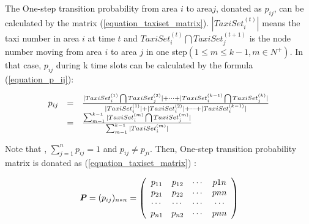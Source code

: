 The One-step transition probability from area $i$ to area$j$, donated as $p_{ij}$, can be calculated by the matrix (\ref{equation_taxiset_matrix}). $|TaxiSet^{(t)}_i|$ means the taxi number in area $i$ at time $t$ and $TaxiSet^{(t)}_i\bigcap TaxiSet^{(t+1)}_j$ is the node number moving from area $i$ to area $j$ in one step$(1\leq m \leq k-1, m\in N^{+} )$.  In that case, $p_{ij}$  during k time slots can be calculated by the formula (\ref{equation_p_ij}):


\begin{equation}\label{equation_p_ij}
\begin{array}{rcl}
  p_{ij}& =&{ {|TaxiSet^{(1)}_i\bigcap TaxiSet^{(2)}_j|+\cdots + |TaxiSet^{(k-1)}_i\bigcap TaxiSet^{(k)}_j|}\over {|TaxiSet^{(1)}_i|+|TaxiSet^{(2)}_i|+\cdots+|TaxiSet^{(k-1)}_i|}} \\
  &=& {\sum_{m=1}^{k-1} |TaxiSet^{(m)}_i\bigcap TaxiSet^{(m)}_j|\over \sum_{m=1}^{k-1}|TaxiSet^{(m)}_i|}\\
  \end{array}
\end{equation}

Note that , $\sum_{j=1}^np_{ij}=1 $ and $p_{ij}\neq p_{ji}$. Then, One-step transition probability matrix is donated as (\ref{equation_taxiset_matrix}) :

\begin{equation}\label{equation_taxiset_matrix}
\textbf{\emph{P}}=(p_{ij})_{n*n}=
\left(
\begin{array}{cccc}
p_{11}&p_{12}&\cdots & p{1n} \\
p_{21}&p_{22}&\cdots & p{nn} \\
\cdots & \cdots & \cdots & \cdots \\
p_{n1}&p_{n2}&\cdots & p{nn} \\
\end{array}
\right)
\end{equation}

